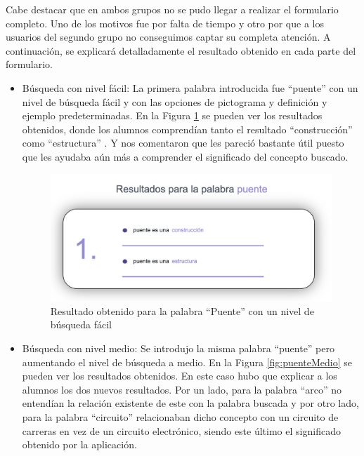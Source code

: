 Cabe destacar que en ambos grupos no se pudo llegar a realizar el formulario completo. Uno de los motivos fue por falta de tiempo y otro por que a los usuarios del segundo grupo no conseguimos captar su completa atención.
A continuación, se explicará detalladamente el resultado obtenido en cada parte del formulario.
\begin{itemize}
	\item Búsqueda con nivel fácil: La primera palabra introducida fue ``puente'' con un nivel de búsqueda fácil y con las opciones de pictograma y definición y ejemplo predeterminadas. En la Figura  \ref{fig:puenteFacil} se pueden ver los resultados obtenidos, donde los alumnos comprendían tanto el resultado ``construcción'' como ``estructura'' . Y nos comentaron que les pareció bastante útil puesto que les ayudaba aún más a comprender el significado del concepto buscado.
	
	\begin{figure}[!h]
		\includegraphics[width=.7\textwidth]{Imagenes/Bitmap/Capitulo4/EvaluacionFinal/1puentefacil.png}
		\centering
		\caption{Resultado obtenido para la palabra ``Puente'' con un nivel de búsqueda fácil}
		\label{fig:puenteFacil}
	\end{figure}
	
	\item Búsqueda con nivel medio: Se introdujo la misma palabra ``puente'' pero aumentando el nivel de búsqueda a medio. En la Figura \ref{fig:puenteMedio} se pueden ver los resultados obtenidos. En este caso hubo que explicar a los alumnos los dos nuevos resultados. Por un lado, para la palabra ``arco'' no entendían la relación existente de este  con la palabra buscada y por otro lado, para la palabra ``circuito'' relacionaban dicho concepto con un circuito de carreras en vez de un circuito electrónico, siendo este último el significado obtenido por la aplicación.
	

\end{itemize}
